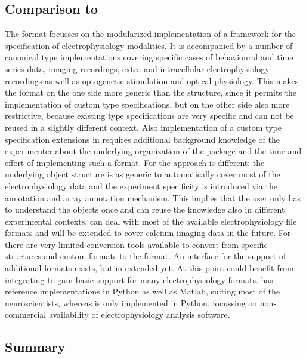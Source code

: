 \subsection{Comparison to }
The  format focusses on the modularized implementation of a framework for the specification of electrophysiology modalities. %
It is accompanied by a number of canonical type implementations covering specific cases of behavioural  and time series data, imaging recordings, extra and intracellular electrophysiology recordings as well as optogenetic stimulation and optical physiology.  %
This makes the  format on the one side more generic than the  structure, since it permits the implementation of custom type specifications, but on the other side also more restrictive, because existing type specifications are very specific and can not be reused in a slightly different context. Also implementation of a custom type specification extensions in  requires additional background knowledge of the experimenter about the underlying organization of the  package and the time and effort of implementing such a format. %
For  the approach is different: the underlying object structure is as generic to automatically cover most of the electrophysiology data and the experiment specificity is introduced via the annotation and array annotation mechanism. This implies that the user only has to understand the  objects once and can reuse the knowledge also in different experimental contexts.
 can deal with most of the available electrophysiology file formats and will be extended to cover calcium imaging data in the future. For  there are very limited conversion tools available to convert from specific  structures and custom formats to the  format. %
An interface for the support of additional formats exists, but in extended yet. At this point  could benefit from integrating  to gain basic support for many electrophysiology formats.
 has reference implementations in Python as well as Matlab, suiting most of the neuroscientists, whereas  is only implemented in Python, focussing on non-commercial availability of electrophysiology analysis software.


\subsection*{Summary}

